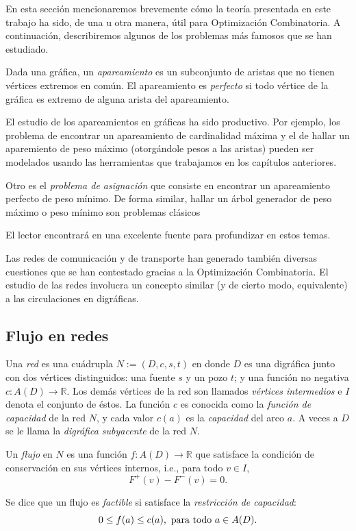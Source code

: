 En esta sección mencionaremos brevemente cómo la teoría presentada en este trabajo ha sido, de una u otra manera, útil para Optimización Combinatoria. A continuación, describiremos algunos de los problemas más famosos que se han estudiado.

Dada una gráfica, un \textit{apareamiento} es un subconjunto de aristas que no tienen vértices extremos en común. El apareamiento es \textit{perfecto} si todo vértice de la gráfica es extremo de alguna arista del apareamiento.

El estudio de los apareamientos en gráficas ha sido productivo. Por ejemplo, los problema de encontrar un apareamiento de cardinalidad máxima y el de hallar un aparemiento de peso máximo (otorgándole pesos a las aristas) pueden ser modelados usando las herramientas que trabajamos en los capítulos anteriores. 

Otro es el \textit{problema de asignación} que consiste en encontrar un apareamiento perfecto de peso mínimo. De forma similar, hallar un árbol generador de peso máximo o peso mínimo son problemas clásicos

El lector encontrará en \cite{Korte} una excelente fuente para profundizar en estos temas.

Las redes de comunicación y de transporte han generado también diversas cuestiones que se han contestado gracias a la Optimización Combinatoria. El estudio de las redes involucra un concepto similar (y de cierto modo, equivalente) a las circulaciones en digráficas.

\subsection{Flujo en redes}
Una \textit{red} es una cuádrupla $N:=(D,c,s,t)$ en donde $D$ es una digráfica junto con dos vértices distinguidos: una fuente $s$ y un pozo $t$; y una función no negativa $c\colon A(D) \rightarrow \mathbb{R}$. Los demás vértices de la red son llamados \textit{vértices intermedios} e $I$ denota el conjunto de éstos. La función $c$ es conocida como la \textit{función de capacidad} de la red $N$, y cada valor $c(a)$ es la \textit{capacidad} del arco $a$. A veces a $D$ se le llama la \textit{digráfica subyacente} de la red $N$.

Un \textit{flujo} en $N$ es una función $f\colon A(D) \rightarrow \mathbb{R}$ que satisface la condición de conservación en sus vértices internos, i.e., para todo $v \in I$,$$ F^{+}(v) - F^{-}(v) = 0.$$

Se dice que un flujo es \textit{factible} si satisface la \textit{restricción de capacidad}: $$0 \leq f(a) \leq c(a), \textnormal{ para todo } a \in A(D).$$

